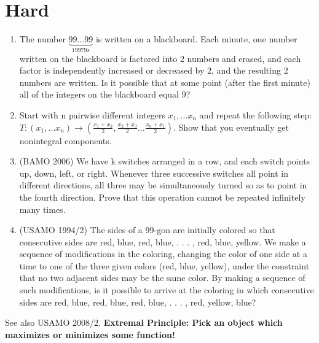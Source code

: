 \documentclass{article}
\begin{document}
\section{Hard}
\begin{enumerate}
\item The number $\underbrace{99\ldots99}_{1997 9s}$ is written on a blackboard. Each minute, one number written on the blackboard is factored into 2 numbers and erased, and each factor is independently increased or decreased by 2, and the resulting 2 numbers are written. Is it possible that at some point (after the first minute) all of the integers on the blackboard equal 9?
\item Start with n pairwise different integers $x_1,\ldots x_n$ and repeat the following step: $T:(x_1,\ldots x_n) \rightarrow (\frac{x_1+x_2}{2}, \frac{x_2+x_3}{2}\ldots \frac{x_n+x_1}{2})$. Show that you eventually get nonintegral components.
\item (BAMO 2006) We have k switches arranged in a row, and each switch points up, down, left, or right. Whenever three successive switches all point in different directions, all three may be simultaneously turned so as to point
in the fourth direction. Prove that this operation cannot be repeated infinitely many times.
\item (USAMO 1994/2) The sides of a 99-gon are initially colored so that consecutive sides are red, blue,
red, blue, . . . , red, blue, yellow. We make a sequence of modifications in the
coloring, changing the color of one side at a time to one of the three given colors
(red, blue, yellow), under the constraint that no two adjacent sides may be the
same color. By making a sequence of such modifications, is it possible to arrive
at the coloring in which consecutive sides are red, blue, red, blue, red, blue, . . . ,
red, yellow, blue?
\end{enumerate}

See also USAMO 2008/2.
\textbf{Extremal Principle: Pick an object which maximizes or minimizes some function!}
\end{document}
